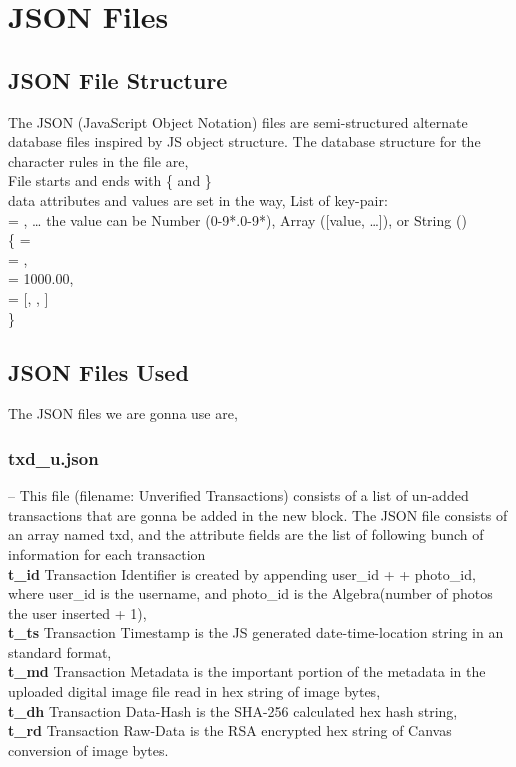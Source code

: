 \section{JSON Files}
\subsection{JSON File Structure}
The JSON (JavaScript Object Notation) files are semi-structured alternate database files inspired by JS object structure. The database structure for the character rules in the file are, \\
File starts and ends with \{ and \} \\
data attributes and values are set in the way, List of key-pair: \\
 = , \ldots
the value can be Number ({0-9}*.{0-9}*), Array ([value, \ldots]), or String () \\
\noindent \{  = \\
\algoTab {} = , \\
\algoTab {} = 1000.00, \\
\algoTab {} = [, , ] \\
\noindent\}

\subsection{JSON Files Used}
The JSON files we are gonna use are,

\subsubsection{txd\_u.json}
-- This file (filename: Unverified Transactions) consists of a list of un-added transactions that are gonna be added in the new block. The JSON file consists of an array named txd, and the attribute fields are the list of following bunch of information for each transaction \\
\textbf{t\_id} Transaction Identifier is created by appending user\_id + \q{\_} + photo\_id, where user\_id is the username, and photo\_id is the Algebra(number of photos the user inserted + 1), \\
\textbf{t\_ts} Transaction Timestamp is the JS generated date-time-location string in an standard format, \\
\textbf{t\_md} Transaction Metadata is the important portion of the metadata in the uploaded digital image file read in hex string of image bytes, \\
\textbf{t\_dh} Transaction Data-Hash is the SHA-256 calculated hex hash string, \\
\textbf{t\_rd} Transaction Raw-Data is the RSA encrypted hex string of Canvas conversion of image bytes.

